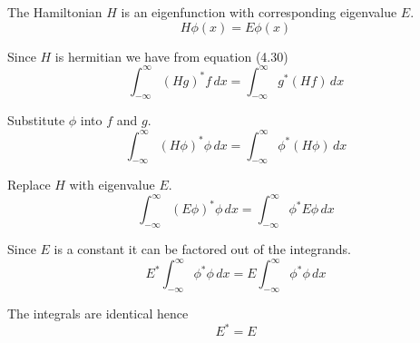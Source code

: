 


The Hamiltonian $H$ is an eigenfunction with corresponding eigenvalue $E$.
\begin{equation*}
H\phi(x)=E\phi(x)
\tag{4.42}
\end{equation*}

Since $H$ is hermitian we have from equation (4.30)
\begin{equation*}
\int_{-\infty}^\infty(Hg)^*f\,dx=\int_{-\infty}^\infty g^*(Hf)\,dx
\tag{4.30}
\end{equation*}

Substitute $\phi$ into $f$ and $g$.
\begin{equation*}
\int_{-\infty}^\infty(H\phi)^*\phi\,dx=\int_{-\infty}^\infty \phi^*(H\phi)\,dx
\end{equation*}

Replace $H$ with eigenvalue $E$.
\begin{equation*}
\int_{-\infty}^\infty (E\phi)^*\phi\,dx=\int_{-\infty}^\infty \phi^*E\phi\,dx
\end{equation*}

Since $E$ is a constant it can be factored out of the integrands.
\begin{equation*}
E^*\int_{-\infty}^\infty\phi^*\phi\,dx=E\int_{-\infty}^\infty \phi^*\phi\,dx
\end{equation*}

The integrals are identical hence
\begin{equation*}
E^*=E
\end{equation*}


